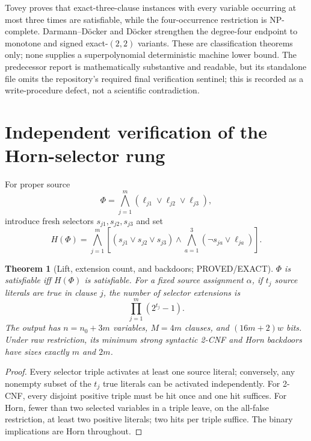 \documentclass[11pt]{article}
\newtheorem{theorem}{Theorem}
\begin{document}
Tovey proves that exact-three-clause instances with every variable occurring at most three times are satisfiable, while the four-occurrence restriction is NP-complete.  Darmann--D\"ocker and D\"ocker strengthen the degree-four endpoint to monotone and signed exact-$(2,2)$ variants.  These are classification theorems only; none supplies a superpolynomial deterministic machine lower bound.  The predecessor report is mathematically substantive and readable, but its standalone file omits the repository's required final verification sentinel; this is recorded as a write-procedure defect, not a scientific contradiction.

\section{Independent verification of the Horn-selector rung}
For proper source
\[
\Phi=\bigwedge_{j=1}^{m}(\ell_{j1}\vee\ell_{j2}\vee\ell_{j3}),
\]
introduce fresh selectors $s_{j1},s_{j2},s_{j3}$ and set
\[
H(\Phi)=\bigwedge_{j=1}^{m}\left[(s_{j1}\vee s_{j2}\vee s_{j3})
\wedge\bigwedge_{a=1}^{3}(\neg s_{ja}\vee\ell_{ja})\right].
\]

\begin{theorem}[Lift, extension count, and backdoors; PROVED/EXACT]
$\Phi$ is satisfiable iff $H(\Phi)$ is satisfiable.  For a fixed source assignment $\alpha$, if $t_j$ source literals are true in clause $j$, the number of selector extensions is
\[
\prod_{j=1}^{m}(2^{t_j}-1).
\]
The output has $n=n_0+3m$ variables, $M=4m$ clauses, and $(16m+2)w$ bits.  Under raw restriction, its minimum strong syntactic 2-CNF and Horn backdoors have sizes exactly $m$ and $2m$.
\end{theorem}
\begin{proof}
Every selector triple activates at least one source literal; conversely, any nonempty subset of the $t_j$ true literals can be activated independently.  For 2-CNF, every disjoint positive triple must be hit once and one hit suffices.  For Horn, fewer than two selected variables in a triple leave, on the all-false restriction, at least two positive literals; two hits per triple suffice.  The binary implications are Horn throughout.
\end{proof}
\end{document}
